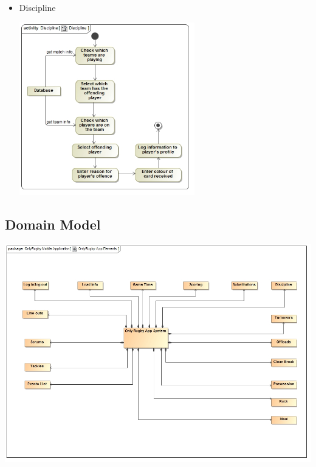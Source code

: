 \documentclass[a4paper,12pt]{report}
\begin{document}
\begin{itemize}
\begin{center}
		\end{center}
	\item Discipline
		\begin{center}
		\includegraphics[width=0.6\textwidth] {./Diagrams/DisciplineActivityDiagram.jpg}\\[0.4cm]
		\end{center}
\end{itemize}
\subsection{Domain Model}
	\begin{center}
  	 	\includegraphics[width=1\textwidth] {./HermanDiagrams/DomainModel.jpg}\\[0.4cm]    
	\end{center}
\end{document}
